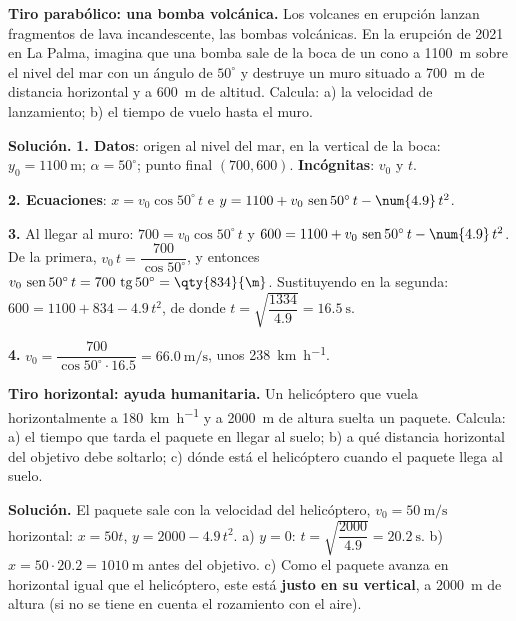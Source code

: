 \begin{example}
    \textbf{Tiro parabólico: una bomba volcánica.} Los volcanes en erupción lanzan fragmentos de lava incandescente, las bombas
    volcánicas. En la erupción de 2021 en La Palma, imagina que una bomba sale de la boca de un cono a \qty{1100}{\m} sobre el nivel
    del mar con un ángulo de \(50^\circ\) y destruye un muro situado a \qty{700}{\m} de distancia horizontal y a \qty{600}{\m} de
    altitud. Calcula: a) la velocidad de lanzamiento; b) el tiempo de vuelo hasta el muro.

    \textbf{Solución.} \textbf{1. Datos}: origen al nivel del mar, en la vertical de la boca: \(y_0 = \qty{1100}{\m}\); \(\alpha =
    50^\circ\); punto final \((700, 600)\). \textbf{Incógnitas}: \(v_0\) y \(t\).

    \textbf{2. Ecuaciones}: \(x = v_0\cos 50^\circ\,t\) e \(y = 1100 + v_0\,\sen 50^\circ\,t - \num{4.9}\,t^2\).

    \textbf{3.} Al llegar al muro: \(700 = v_0\cos 50^\circ\,t\) y \(600 = 1100 + v_0\,\sen 50^\circ\,t - \num{4.9}\,t^2\). De la
    primera, \(v_0\,t = \dfrac{700}{\cos 50^\circ}\), y entonces \(v_0\,\sen 50^\circ\,t = 700\,\tg 50^\circ = \qty{834}{\m}\).
    Sustituyendo en la segunda: \(600 = 1100 + 834 - \num{4.9}\,t^2\), de donde \(t = \sqrt{\dfrac{1334}{\num{4.9}}} = \qty{16.5}{\s}\).

    \textbf{4.} \(v_0 = \dfrac{700}{\cos 50^\circ \cdot \num{16.5}} = \qty{66.0}{\m\per\s}\), unos \qty{238}{\km\per\hour}.
\end{example}

\begin{example}
    \textbf{Tiro horizontal: ayuda humanitaria.} Un helicóptero que vuela horizontalmente a \qty{180}{\km\per\hour} y a
    \qty{2000}{\m} de altura suelta un paquete. Calcula: a) el tiempo que tarda el paquete en llegar al suelo; b) a qué distancia
    horizontal del objetivo debe soltarlo; c) dónde está el helicóptero cuando el paquete llega al suelo.

    \textbf{Solución.} El paquete sale con la velocidad del helicóptero, \(v_0 = \qty{50}{\m\per\s}\) horizontal:
    \(x = 50t\), \(y = 2000 - \num{4.9}\,t^2\).
    a) \(y = 0\): \(t = \sqrt{\dfrac{2000}{\num{4.9}}} = \qty{20.2}{\s}\). b) \(x = 50 \cdot \num{20.2} = \qty{1010}{\m}\) antes del
    objetivo. c) Como el paquete avanza en horizontal igual que el helicóptero, este está \textbf{justo en su vertical}, a
    \qty{2000}{\m} de altura (si no se tiene en cuenta el rozamiento con el aire).
\end{example}

